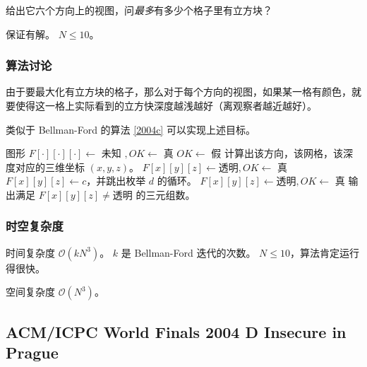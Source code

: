				给出它六个方向上的视图，问\emph{最多}有多少个格子里有立方块？
				
				保证有解。 $N \le 10$。
			\subsubsection{算法讨论}
				由于要最大化有立方块的格子，那么对于每个方向的视图，如果某一格有颜色，就要使得这一格上实际看到的立方快深度越浅越好（离观察者越近越好）。
				
				类似于 Bellman-Ford 的算法 \ref{2004c} 可以实现上述目标。
				\begin{algorithm}[H]
				\caption{}
				\label{2004c}
					\begin{algorithmic}[1]
						\State 图形 $F[\cdot][\cdot][\cdot] \gets \text{ 未知 }, OK \gets $ 真
							\State $OK \gets $ 假
									\State 计算出该方向，该网格，该深度对应的三维坐标 $(x, y, z)$。
										\State $F[x][y][z] \gets\text{透明} , OK \gets $ 真 
									\EndIf
										\State $F[x][y][z] \gets c$，并跳出枚举 $d$ 的循环。
									\EndIf
										\State $F[x][y][z] \gets\text{透明} , OK \gets $ 真 
									\EndIf
								\EndFor
							\EndFor
						\State 输出满足 $F[x][y][z] \ne \text{透明} $   的三元组数。 
						\EndFor
					\end{algorithmic}
				\end{algorithm}	
			\subsubsection{时空复杂度}
				时间复杂度 $\mathcal{O}\left(k N^3\right)$。 $k$ 是  Bellman-Ford  迭代的次数。 $N \le 10$，算法肯定运行得很快。
					
				空间复杂度 $\mathcal{O}\left(N^3\right)$。
		\newpage
		\subsection{ACM/ICPC World Finals 2004 D Insecure in Prague}
